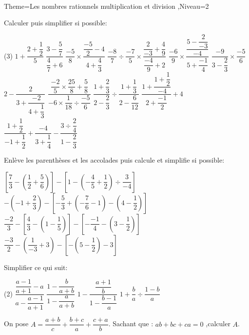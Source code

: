 \documentclass[a4paper,12pt]{article}
\begin{document}
\begin{Maquette}[Fiche]{Theme=Les nombres rationnels multiplication et division ,Niveau=2}

\begin{exercice}
Calculer puis simplifier si possible:
\begin{tasks}(3)
\task $1+\dfrac{2+\dfrac{1}{2}}{5}$
\task $\dfrac{3-\dfrac{5}{7}}{\dfrac{4}{7}+6}$
\task $\dfrac{-5}{8}\times \dfrac{\dfrac{-5}{2}-4}{4+\dfrac{4}{3}}$
\task $\dfrac{-8}{7}\div\dfrac{-7}{5}\times\dfrac{\dfrac{2}{-3}+\dfrac{4}{9}}{\dfrac{-4}{9}+2}$
\task $\dfrac{-6}{9}\times\dfrac{\dfrac{5-\dfrac{2}{-3}}{-4}}{5+\dfrac{-1}{4}}$
\task $\dfrac{-9}{3-\dfrac{2}{3}}\times\dfrac{-5}{6}$
\task $2-\dfrac{2}{3+\dfrac{-2}{4+\dfrac{1}{3}}}$
\task $\dfrac{\dfrac{-2}{5}\times\dfrac{25}{8}+\dfrac{5}{8}}{-6\times\dfrac{1}{18}\div\dfrac{-5}{6}}$
\task $\dfrac{1+\dfrac{2}{3}}{2-\dfrac{2}{3}}\div\dfrac{1+\dfrac{1}{3}}{2-\dfrac{6}{12}}$
\task $\dfrac{1+\dfrac{1+\dfrac{1}{2}}{-4}}{2+\dfrac{-1}{2}}+4$
\task $\dfrac{1+\dfrac{1}{2}}{-1+\dfrac{1}{2}}+\dfrac{-4}{3+\dfrac{1}{4}}-\dfrac{3\div\dfrac{2}{4}}{1-\dfrac{2}{3}}$
\end{tasks}
\end{exercice}

\begin{exercice}
Enlève les parenthèses et les accolades puis calcule et simplifie si possible:
\begin{tasks}
\task $\left[\dfrac{7}{3}-\left(\dfrac{1}{2}+\dfrac{5}{6}\right)\right]-\left[1-\left(-\dfrac{4}{5}+\dfrac{1}{2}\right)\div\dfrac{3}{-4}\right]$
\task $-\left(-1+\dfrac{2}{3}\right)-\left[-\dfrac{5}{3}+\left(-\dfrac{7}{6}-1\right)-\left(4-\dfrac{1}{2}\right)\right]$
\task $\dfrac{-2}{3}-\left[\dfrac{4}{3}-\left(1-\dfrac{1}{5}\right)\right]-\left[-\dfrac{-1}{4}-\left(3-\dfrac{1}{2}\right)\right]$
\task $\dfrac{-3}{2}-\left(\dfrac{1}{-3}+3\right)-\left[-\left(5-\dfrac{1}{2}\right)-3\right]$
\end{tasks}
\end{exercice}

\begin{exercice}
Simplifier ce qui suit:
\begin{tasks}(2)
\task $\dfrac{\dfrac{a-1}{a+1}-a}{a-\dfrac{a-1}{a+1}} $
\task $\dfrac{1-\dfrac{b}{a+b}}{1-\dfrac{a}{a+b}} $
\task $1-\dfrac{\dfrac{a+1}{b}}{1-\dfrac{b-1}{a}} $
\task $1+\dfrac{b}{a}\div \dfrac{1-b}{a}$
\end{tasks}
\end{exercice}

\begin{exercice}
On pose $A=\dfrac{a+b}{c}+\dfrac{b+c}{a}+\dfrac{c+a}{b}$.\vspace{0.3cm}\newline
Sachant que : $ab+bc+ca=0$ ,calculer $A$.
\end{exercice}


\end{Maquette}
\end{document}
